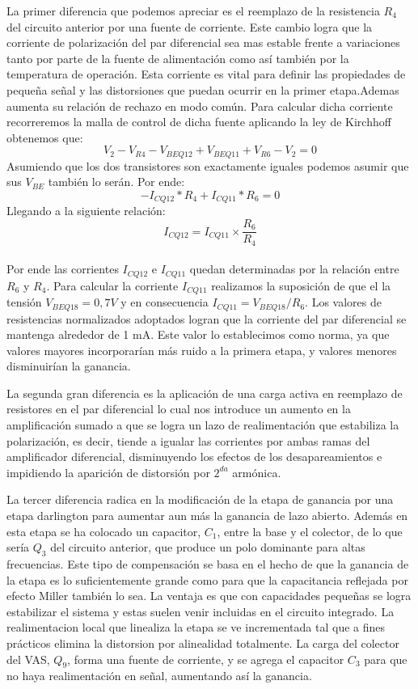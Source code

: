 La primer diferencia que podemos apreciar es el reemplazo de la resistencia $R_4$ del circuito anterior por una fuente de corriente. Este cambio logra que la corriente de polarización del par diferencial sea mas estable frente a variaciones tanto por parte de la fuente de alimentación como así también por la temperatura de operación. Esta corriente es vital para definir las propiedades de pequeña señal y las distorsiones que puedan ocurrir en la primer etapa.Ademas aumenta su relación de rechazo en modo común.
Para calcular dicha corriente recorreremos la malla de control de dicha fuente aplicando la ley de Kirchhoff obtenemos que:
$$
V_{2} - V_{R4} - V_{BE Q12} + V_{BE Q11} + V_{R6} - V_{2} = 0
$$
Asumiendo que los dos transistores son exactamente iguales podemos asumir que sus $V_{BE}$ también lo serán. Por ende:
$$
- I_{C Q12} * R_{4} + I_{C Q11} * R_{6} = 0
$$
Llegando a la siguiente relación:
$$
I_{C Q12} = I_{C Q11} \times \frac{R_6}{R_4}
$$
\\
Por ende las corrientes $I_{C Q12}$ e $I_{C Q11}$  quedan determinadas por la relación entre $R_6$ y $R_4$. Para calcular la corriente $ I_{C Q11}$ realizamos la suposición de que el la tensión $V_{BE Q18}= 0,7V$ y en consecuencia $I_{C Q11}= {V_{BE Q18}}/{R_6}$. Los valores de resistencias normalizados adoptados logran que la corriente del par diferencial se mantenga alrededor de 1 mA. Este valor lo establecimos como norma, ya que valores mayores incorporarían más ruido a la primera etapa, y valores menores disminuirían la ganancia.

La segunda gran diferencia es la aplicación de una carga activa en reemplazo de resistores en el par diferencial lo cual nos introduce un aumento en la amplificación sumado a que se logra un lazo de realimentación que estabiliza la polarización, es decir, tiende a igualar las corrientes por ambas ramas del amplificador diferencial, disminuyendo los efectos de los desapareamientos e impidiendo la aparición de distorsión por $2^{da}$ armónica.

La tercer diferencia radica en la modificación de la etapa de ganancia por una etapa darlington para aumentar aun más la ganancia de lazo abierto. Además en esta etapa se ha colocado un capacitor, $C_1$, entre la base y el colector, de lo que sería $Q_3$ del circuito anterior, que produce un polo dominante para altas frecuencias. Este tipo de compensación se basa en el hecho de que la ganancia de la etapa es lo suficientemente grande como para que la capacitancia reflejada por efecto Miller también lo sea. La ventaja es que con capacidades pequeñas se logra estabilizar el sistema y estas suelen venir incluidas en el circuito integrado. La realimentacion local que linealiza la etapa se ve incrementada tal que a fines prácticos elimina la distorsion por alinealidad totalmente. La carga del colector del VAS, $Q_9$, forma una fuente de corriente, y se agrega el capacitor $C_3$ para que no haya realimentación en señal, aumentando así la ganancia.

